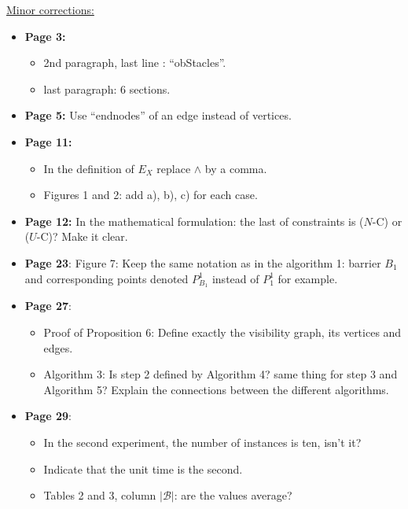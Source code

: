 \documentclass{article}
\newenvironment{reviewer}{\setcounter{pointcounter}{1}}{}
\begin{document}
\begin{reviewer}
		
		\begin{itshape}
			\underline{Minor corrections:}
			\begin{itemize}
				\item \textbf{Page 3:} 
				\begin{itemize}
					\item 2nd paragraph, last line : ``obStacles''.
					\item last paragraph: 6 sections.
				\end{itemize}
				\item \textbf{Page 5:} Use ``endnodes'' of an edge instead of vertices.
				\item \textbf{Page 11:} 
				\begin{itemize} 
					\item In the definition of $E_X$ replace $\wedge$ by a comma.
					\item Figures 1 and 2: add a), b), c) for each case.
				\end{itemize}
				\item \textbf{Page 12:} In the mathematical formulation: the last of constraints is ($N$-C) or ($U$-C)? Make it clear.
				\item \textbf{Page 23}: Figure 7: Keep the same notation as in the algorithm 1: barrier $B_1$ and corresponding points denoted $P^1_{B_1}$ instead of $P^1_1$ for example. 
				\item \textbf{Page 27}: 
				\begin{itemize}
					\item Proof of Proposition 6: Define exactly the visibility graph, its vertices and edges.
					\item Algorithm 3: Is step 2 defined by Algorithm 4? same thing for step 3 and Algorithm 5? Explain the connections between the different algorithms.
				\end{itemize}
				\item \textbf{Page 29}:
				\begin{itemize}
					\item In the second experiment, the number of instances is ten, isn’t it?
					\item Indicate that the unit time is the second.
					\item Tables 2 and 3, column $|\mathcal B|$: are the values average?
				\end{itemize}
			\end{itemize}
			
		\end{itshape}

				
	\end{reviewer}
	
\end{document}
